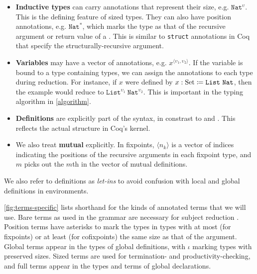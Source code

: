 \documentclass[sigplan,10pt,anonymous,review]{acmart}
\begin{document}
\begin{itemize}
    \item \textbf{Inductive types} can carry annotations that represent their size, e.g. $\texttt{Nat}^\upsilon$. This is the defining feature of sized types. They can also have position annotations, e.g. $\texttt{Nat}^*$, which marks the type as that of the recursive argument or return value of a \cofixpoint. This is similar to \texttt{struct} annotations in Coq that specify the structurally-recursive argument.
    \item \textbf{Variables} may have a vector of annotations, e.g. $x^{\langle \upsilon_1, \upsilon_2 \rangle}$. If the variable is bound to a type containing \coinductive types, we can assign the annotations to each \coinductive type during reduction. For instance, if $x$ were defined by $x : \text{Set} \coloneqq \texttt{List}\ \texttt{Nat}$, then the example would reduce to $\texttt{List}^{\upsilon_1}\ \texttt{Nat}^{\upsilon_2}$. This is important in the typing algorithm in \autoref{algorithm}.
    \item \textbf{Definitions} are explicitly part of the syntax, in constrast to \CIChat and \CIChatbar \cite{cic-hat-bar}. This reflects the actual structure in Coq's kernel.
    \item We also treat \textbf{mutual \cofixpoints} explicitly. In fixpoints, $\langle n_k \rangle$ is a vector of indices indicating the positions of the recursive arguments in each fixpoint type, and $m$ picks out the $m$th \cofixpoint in the vector of mutual definitions.
\end{itemize}

We also refer to definitions \cite{ptsdef} as \textit{let-ins} to avoid confusion with local and global definitions in environments.

\begin{comment}
The simplicity of the size algebra of $S$, with only the successor operation $\widehat{\cdot}$, allows for easy and efficient size inference. We elaborate on this in \autoref{algorithm}.
\end{comment}



\autoref{fig:terms-specific} lists shorthand for the kinds of annotated terms that we will use. Bare terms as used in the grammar are necessary for subject reduction \cite{cic-hat-bar}. Position terms have asterisks to mark the types in \cofixpoint types with at most (for fixpoints) or at least (for cofixpoints) the same size as that of the \corecursive argument. Global terms appear in the types of global definitions, with $\iota$ marking types with preserved sizes. Sized terms are used for termination- and productivity-checking, and full terms appear in the types and terms of global declarations.
\end{document}
